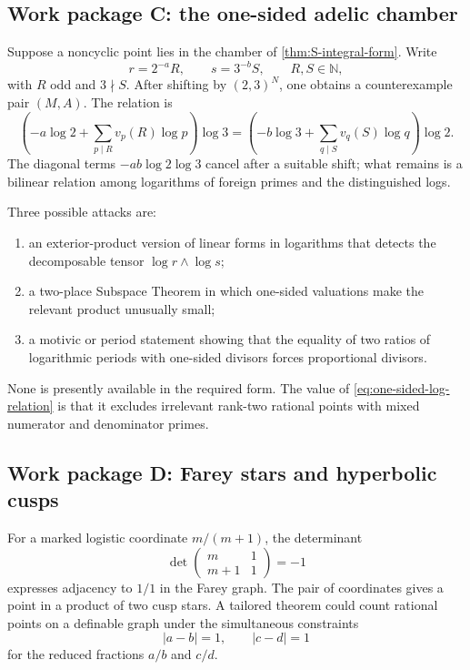 \documentclass[10pt,oneside]{article}
\theoremstyle{definition}
\theoremstyle{remark}
\newcommand{\N}{\mathbb N}
\begin{document}
\subsection{Work package C: the one-sided adelic chamber}
Suppose a noncyclic point lies in the chamber of \cref{thm:S-integral-form}.  Write
\[
 r=2^{-a}R,
 \qquad
 s=3^{-b}S,
 \qquad
 R,S\in\N,
\]
with \(R\) odd and \(3\nmid S\).  After shifting by \((2,3)^N\), one obtains a counterexample pair \((M,A)\).  The relation is
\begin{equation}
 \left(-a\log2+\sum_{p\mid R}v_p(R)\log p\right)\log3
 =
 \left(-b\log3+\sum_{q\mid S}v_q(S)\log q\right)\log2.
\label{eq:one-sided-log-relation}
\end{equation}
The diagonal terms \(-ab\log2\log3\) cancel after a suitable shift; what remains is a bilinear relation among logarithms of foreign primes and the distinguished logs.

Three possible attacks are:
\begin{enumerate}
\item an exterior-product version of linear forms in logarithms that detects the decomposable tensor
\(\log r\wedge\log s\);
\item a two-place Subspace Theorem in which one-sided valuations make the relevant product unusually small;
\item a motivic or period statement showing that the equality of two ratios of logarithmic periods with one-sided divisors forces proportional divisors.
\end{enumerate}
None is presently available in the required form.  The value of \eqref{eq:one-sided-log-relation} is that it excludes irrelevant rank-two rational points with mixed numerator and denominator primes.

\subsection{Work package D: Farey stars and hyperbolic cusps}
For a marked logistic coordinate \(m/(m+1)\), the determinant
\[
 \det\begin{pmatrix}m&1\\m+1&1\end{pmatrix}=-1
\]
expresses adjacency to \(1/1\) in the Farey graph.  The pair of coordinates gives a point in a product of two cusp stars.  A tailored theorem could count rational points on a definable graph under the simultaneous constraints
\[
 |a-b|=1,
 \qquad
 |c-d|=1
\]
for the reduced fractions \(a/b\) and \(c/d\).
\end{document}
